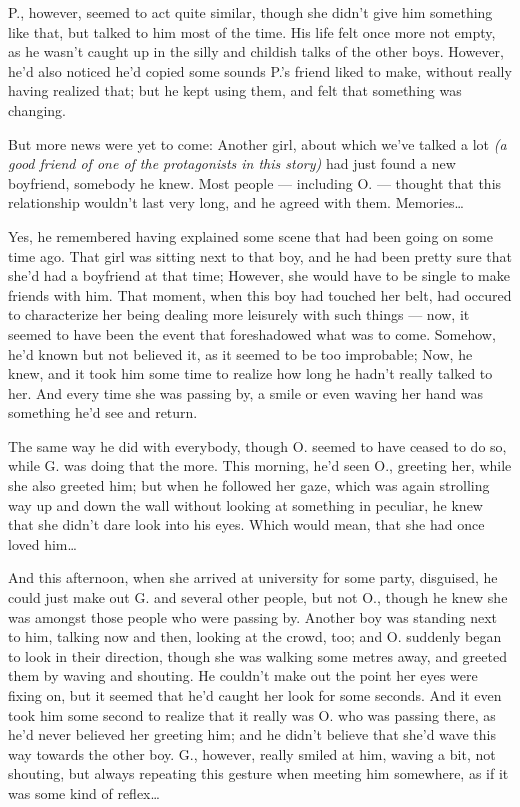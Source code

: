 P., however, seemed to act quite similar, though she didn't give him something like that, but talked to him most of the time. 
His life felt once more not empty, as he wasn't caught up in the silly and childish talks of the other boys. However, he'd also noticed he'd copied some sounds P.'s friend liked to make, without really having realized that; but he kept using them, and felt that something was changing.

But more news were yet to come: Another girl, about which we've talked a lot \emph{(a good friend of one of the protagonists in this story)} had just found a new boyfriend, somebody he knew. Most people --- including O. --- thought that this relationship wouldn't last very long, and he agreed with them. 
Memories\dots{}

Yes, he remembered having explained some scene that had been going on some time ago. That girl was sitting next to that boy, and he had been pretty sure that she'd had a boyfriend at that time; However, she would have to be single to make friends with him. That moment, when this boy had touched her belt, had occured to characterize her being dealing more leisurely with such things --- now, it seemed to have been the event that foreshadowed what was to come. Somehow, he'd known but not believed it, as it seemed to be too improbable; Now, he knew, and it took him some time to realize how long he hadn't really talked to her. And  every time she was passing by, a smile or even waving her hand was something he'd see and return.

The same way he did with everybody, though O. seemed to have ceased to do so, while G. was doing that the more. 
This morning, he'd seen O., greeting her, while she also greeted him; but when he followed her gaze, which was again strolling way up and down the wall without looking at something in peculiar, he knew that she didn't dare look into his eyes. Which would mean, that she had once loved him\dots{}

And this afternoon, when she arrived at university for some party, disguised, he could just make out G. and several other people, but not O., though he knew she was amongst those people who were passing by. Another boy was standing next to him, talking now and then, looking at the crowd, too; and O. suddenly began to look in their direction, though she was walking some metres away, and greeted them by waving and shouting. He couldn't make out the point her eyes were fixing on, but it seemed that he'd caught her look for some seconds. And it even took him some second to realize that it really was O. who was passing there, as he'd never believed her greeting him; and he didn't believe that she'd wave this way towards the other boy. G., however, really smiled at him, waving a bit, not shouting, but always repeating this gesture when meeting him somewhere, as if it was some kind of reflex\dots{}

